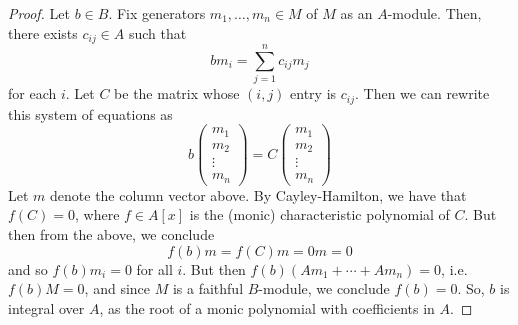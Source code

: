 \begin{proof}
	Let $b \in B$. Fix generators $m_1,\ldots,m_n \in M$ of $M$ as an $A$-module. Then, there exists $c_{ij} \in A$ such that
	\[ bm_i = \sum_{j=1}^n c_{ij}m_j \]
	for each $i$. Let $C$ be the matrix whose $(i,j)$ entry is $c_{ij}$. Then we can rewrite this system of equations as
	\[ b\left(\begin{array}{c} m_1 \\ m_2 \\ \vdots \\ m_n \end{array}\right) = C\left(\begin{array}{c} m_1 \\ m_2 \\ \vdots \\ m_n \end{array}\right) \]
	Let $m$ denote the column vector above. By Cayley-Hamilton, we have that $f(C) = 0$, where $f \in A[x]$ is the (monic) characteristic polynomial of $C$. But then from the above, we conclude
	\[ f(b)m = f(C)m = 0m = 0 \]
	and so $f(b)m_i = 0$ for all $i$. But then $f(b)(Am_1 + \cdots + Am_n) = 0$, i.e. $f(b)M = 0$, and since $M$ is a faithful $B$-module, we conclude $f(b) = 0$. So, $b$ is integral over $A$, as the root of a monic polynomial with coefficients in $A$.
\end{proof}
